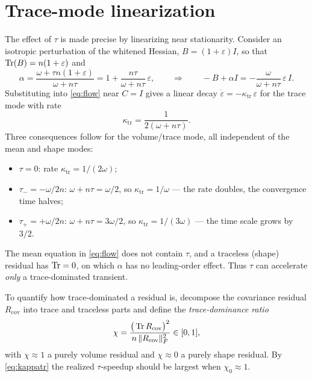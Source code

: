 \documentclass[11pt]{article}
\begin{document}
\section{Trace-mode linearization}\label{sec:linearization}

The effect of $\tau$ is made precise by linearizing near stationarity. Consider
an isotropic perturbation of the whitened Hessian, $B=(1+\varepsilon)I$, so that
$\operatorname{Tr}(B)=n(1+\varepsilon)$ and
\begin{equation}
\alpha=\frac{\omega+\tau n(1+\varepsilon)}{\omega+n\tau}
       =1+\frac{n\tau}{\omega+n\tau}\,\varepsilon,
\qquad\Longrightarrow\qquad
-B+\alpha I=-\frac{\omega}{\omega+n\tau}\,\varepsilon\,I.
\end{equation}
Substituting into \eqref{eq:flow} near $C=I$ gives a linear decay
$\dot\varepsilon=-\kappa_{\mathrm{tr}}\,\varepsilon$ for the trace mode with rate
\begin{equation}\label{eq:kappatr}
\kappa_{\mathrm{tr}}=\frac{1}{2(\omega+n\tau)}.
\end{equation}
Three consequences follow for the volume/trace mode, all independent of the
mean and shape modes:
\begin{itemize}\itemsep2pt
  \item $\tau=0$: rate $\kappa_{\mathrm{tr}}=1/(2\omega)$;
  \item $\tau_-=-\omega/2n$: $\omega+n\tau=\omega/2$, so $\kappa_{\mathrm{tr}}=1/\omega$ --- the rate doubles, the convergence time halves;
  \item $\tau_+=+\omega/2n$: $\omega+n\tau=3\omega/2$, so $\kappa_{\mathrm{tr}}=1/(3\omega)$ --- the time scale grows by $3/2$.
\end{itemize}
The mean equation in \eqref{eq:flow} does not contain $\tau$, and a traceless
(shape) residual has $\operatorname{Tr}=0$, on which $\alpha$ has no leading-order effect. Thus
$\tau$ can accelerate \emph{only} a trace-dominated transient.

To quantify how trace-dominated a residual is, decompose the covariance residual
$R_{\mathrm{cov}}$ into trace and traceless parts and define the
\emph{trace-dominance ratio}
\begin{equation}\label{eq:chi}
\chi=\frac{\big(\operatorname{Tr} R_{\mathrm{cov}}\big)^2}{n\,\|R_{\mathrm{cov}}\|_F^2}\in[0,1],
\end{equation}
with $\chi\approx1$ a purely volume residual and $\chi\approx0$ a purely shape
residual. By \eqref{eq:kappatr} the realized $\tau$-speedup should be largest
when $\chi_0\approx1$.
\end{document}
